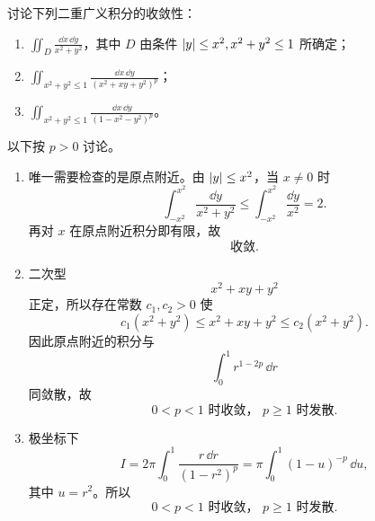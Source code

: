 \begin{xexercise}[4]
讨论下列二重广义积分的收敛性：
  \begin{enumerate}[label=(\arabic*)]
    \item $\displaystyle\iint_D\frac{\dd x\,\dd y}{x^2+y^2}$，其中 $D$ 由条件 $\lvert y\rvert\le x^2,x^2+y^2\le1$ 所确定；
    \item $\displaystyle\iint_{x^2+y^2\le1}\frac{\dd x\,\dd y}{(x^2+xy+y^2)^p}$；
    \item $\displaystyle\iint_{x^2+y^2\le1}\frac{\dd x\,\dd y}{(1-x^2-y^2)^p}$。
  \end{enumerate}
\end{xexercise}
\begin{xsolution}
以下按 $p>0$ 讨论。
\begin{enumerate}[label=(\arabic*)]
  \item 唯一需要检查的是原点附近。由 $\lvert y\rvert\le x^2$，当 $x\ne0$ 时
  \[
   \int_{-x^2}^{x^2}\frac{\dd y}{x^2+y^2}
   \le\int_{-x^2}^{x^2}\frac{\dd y}{x^2}=2.
  \]
  再对 $x$ 在原点附近积分即有限，故
  \[
    \boxed{\text{收敛}}.
  \]

  \item 二次型
  \[
    x^2+xy+y^2
  \]
  正定，所以存在常数 $c_1,c_2>0$ 使
  \[
    c_1(x^2+y^2)\le x^2+xy+y^2\le c_2(x^2+y^2).
  \]
  因此原点附近的积分与
  \[
    \int_0^1r^{1-2p}\,\dd r
  \]
  同敛散，故
  \[
    \boxed{0<p<1\text{ 时收敛， }p\ge1\text{ 时发散}}.
  \]

  \item 极坐标下
  \[
   I=2\pi\int_0^1\frac{r\,\dd r}{(1-r^2)^p}
   =\pi\int_0^1(1-u)^{-p}\,\dd u,
  \]
  其中 $u=r^2$。所以
  \[
    \boxed{0<p<1\text{ 时收敛， }p\ge1\text{ 时发散}}.
  \]
\end{enumerate}
\end{xsolution}


